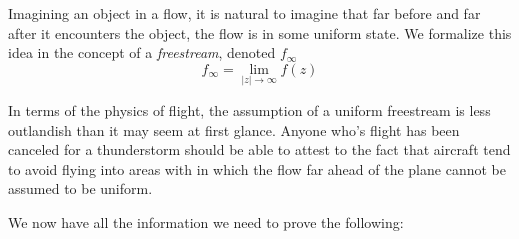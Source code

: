 \documentclass[letterpaper, twoside, 12 pt]{article}
\begin{document}
	\begin{definition}[Freestream]
		Imagining an object in a flow, it is natural to imagine that far before and far after it encounters the object, the flow is in some uniform state.
		We formalize this idea in the concept of a \textit{freestream}, denoted $f_\infty$
		\[
			f_\infty = \lim_{|z| \to \infty} f(z)
		\]
	\end{definition}

	\begin{remark}
		In terms of the physics of flight, the assumption of a uniform freestream is less outlandish than it may seem at first glance.
		Anyone who's flight has been canceled for a thunderstorm should be able to attest to the fact that aircraft tend to avoid flying into areas with in which the flow far ahead of the plane cannot be assumed to be uniform.
	\end{remark}

	We now have all the information we need to prove the following:
\end{document}
